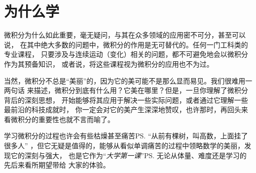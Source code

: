\section{为什么学}

微积分为什么如此重要，毫无疑问，与其在众多领域的应用密不可分，甚至可以说，
在其中绝大多数的问题中，微积分的作用是无可替代的。任何一门工科类的专业课程，
只要涉及与连续运动（变化）相关的问题，都不可避免地会以微积分作为其预备知识，
或者说，将这些课程视为微积分的应用也不为过。

当然，微积分不总是“美丽”的，因为它的美可能不是那么显而易见。我们很难用一两句话
来描述，微积分到底有什么用？它美在哪里？但是，一旦你理解了微积分背后的深刻思想，
开始能够将其应用于解决一些实际问题，或者通过它理解一些最前沿的科技成就时，
你一定会对它的美产生深深地赞叹，也许那时，再回头来看微积分的重要性也就不言而喻了。

学习微积分的过程也许会有些枯燥甚至痛苦\ps{“从前有棵树，叫高数，上面挂了很多人”}
，但它无疑是值得的，能够从看似单调痛苦的过程中领略数学的美丽，发现它的深刻与强大，
也是它作为“{\it 大学第一课}”\ps{无论从体量、难度还是学习的先后来看}所期望带给
大家的体验。

